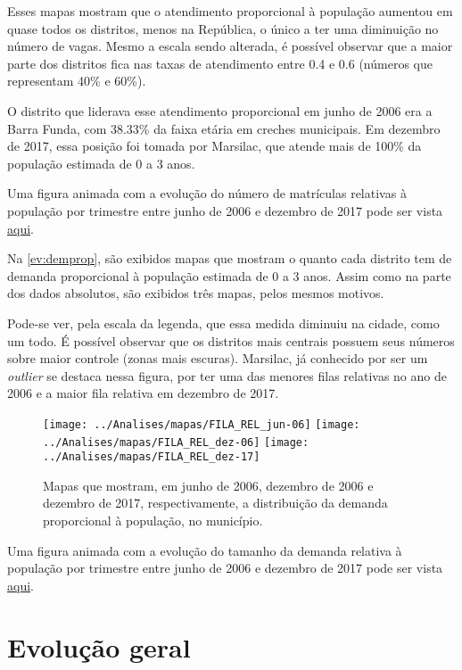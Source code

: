 Esses mapas mostram que o atendimento proporcional à população aumentou em quase todos os distritos, menos na República, o único a ter uma diminuição no número de vagas. Mesmo a escala sendo alterada, é possível observar que a maior parte dos distritos fica nas taxas de atendimento entre 0.4 e 0.6 (números que representam 40\% e 60\%).

O distrito que liderava esse atendimento proporcional em junho de 2006 era a Barra Funda, com 38.33\% da faixa etária em creches municipais. Em dezembro de 2017, essa posição foi tomada por Marsilac, que atende mais de 100\% da população estimada de 0 a 3 anos. 

Uma figura animada com a evolução do número de matrículas relativas à população por trimestre entre junho de 2006 e dezembro de 2017 pode ser vista \href{https://lsflp.github.io/MAC0213/Multimidia/ATEND_REL.gif}{aqui}.

Na \autoref{ev:demprop}, são exibidos mapas que mostram o quanto cada distrito tem de demanda proporcional à população estimada de 0 a 3 anos. Assim como na parte dos dados absolutos, são exibidos três mapas, pelos mesmos motivos. 

Pode-se ver, pela escala da legenda, que essa medida diminuiu na cidade, como um todo. É possível observar que os distritos mais centrais possuem seus números sobre maior controle (zonas mais escuras). Marsilac, já conhecido por ser um \textit{outlier} se destaca nessa figura, por ter uma das menores filas relativas no ano de 2006 e a maior fila relativa em dezembro de 2017.

\begin{figure}[H]
	\centering
	\texttt{[image: ../Analises/mapas/FILA\_REL\_jun-06]}
	\texttt{[image: ../Analises/mapas/FILA\_REL\_dez-06]}
	\texttt{[image: ../Analises/mapas/FILA\_REL\_dez-17]}
	\caption{Mapas que mostram, em junho de 2006, dezembro de 2006 e dezembro de 2017, respectivamente, a distribuição da demanda proporcional à população, no município.}
	\label{ev:demprop}
\end{figure}

Uma figura animada com a evolução do tamanho da demanda relativa à população por trimestre entre junho de 2006 e dezembro de 2017 pode ser vista \href{https://lsflp.github.io/MAC0213/Multimidia/FILA_REL.gif}{aqui}.

\section{Evolução geral}

